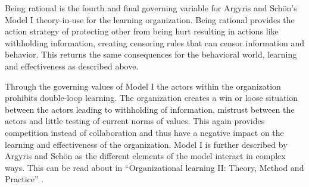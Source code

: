 Being rational is the fourth and final governing variable for Argyris and Schön's Model I theory-in-use for the learning organization. Being rational provides the action strategy of protecting other from being hurt resulting in actions like withholding information, creating censoring rules that can censor information and behavior. This returns the same consequences for the behavioral world, learning and effectiveness as described above. 

Through the governing values of Model I the actors within the organization prohibits double-loop learning. The organization creates a win or loose situation between the actors leading to withholding of information, mistrust between the actors and little testing of current norms of values. This again provides competition instead of collaboration and thus have a negative impact on the learning and effectiveness of the organization. Model I is further described by Argyris and Schön as the different elements of the model interact in complex ways. This can be read about in ``Organizational learning II: Theory, Method and Practice'' \cite{Argyris1996}.

